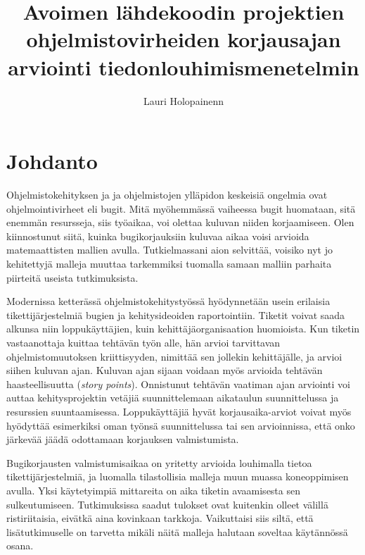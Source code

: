 \documentclass[utf8]{gradu3}
\begin{document}
\title{Avoimen lähdekoodin projektien ohjelmistovirheiden korjausajan arviointi tiedonlouhimismenetelmin}
 \avainsanat{} \keywords{} 
\abstract{}

\author{Lauri Holopainenn}

\maketitle

\mainmatter

\chapter{Johdanto}
Ohjelmistokehityksen ja  ja ohjelmistojen ylläpidon keskeisiä ongelmia ovat
ohjelmointivirheet eli bugit. Mitä myöhemmässä vaiheessa bugit huomataan, sitä
enemmän resursseja, siis työaikaa, voi olettaa kuluvan niiden korjaamiseen. Olen
kiinnostunut siitä, kuinka bugikorjauksiin kuluvaa aikaa voisi arvioida
matemaattisten mallien avulla. Tutkielmassani aion selvittää, voisiko nyt jo
kehitettyjä malleja muuttaa tarkemmiksi tuomalla samaan malliin parhaita
piirteitä useista tutkimuksista.

Modernissa ketterässä ohjelmistokehitystyössä hyödynnetään usein erilaisia
tikettijärjestelmiä bugien ja kehitysideoiden raportointiin. Tiketit voivat
saada alkunsa niin loppukäyttäjien, kuin kehittäjäorganisaation huomioista. Kun
tiketin vastaanottaja kuittaa tehtävän työn alle, hän arvioi tarvittavan
ohjelmistomuutoksen kriittisyyden, nimittää sen jollekin kehittäjälle, ja arvioi
siihen kuluvan ajan. Kuluvan ajan sijaan voidaan myös arvioida tehtävän
haasteellisuutta (\textit{story points}). Onnistunut tehtävän vaatiman ajan
arviointi voi auttaa kehitysprojektin vetäjiä suunnittelemaan aikataulun
suunnittelussa ja resurssien suuntaamisessa. Loppukäyttäjiä hyvät
korjausaika-arviot voivat myös hyödyttää esimerkiksi oman työnsä suunnittelussa
tai sen arvioinnissa, että onko järkevää jäädä odottamaan korjauksen
valmistumista.

Bugikorjausten valmistumisaikaa on yritetty arvioida louhimalla tietoa
tikettijärjestelmiä, ja luomalla tilastollisia malleja muun muassa koneoppimisen
avulla. Yksi käytetyimpiä mittareita on aika tiketin avaamisesta sen
sulkeutumiseen. Tutkimuksissa saadut tulokset ovat kuitenkin olleet välillä
ristiriitaisia, eivätkä aina kovinkaan tarkkoja. Vaikuttaisi siis siltä, että
lisätutkimuselle on tarvetta mikäli näitä malleja halutaan soveltaa käytännössä
osana.
\end{document}
